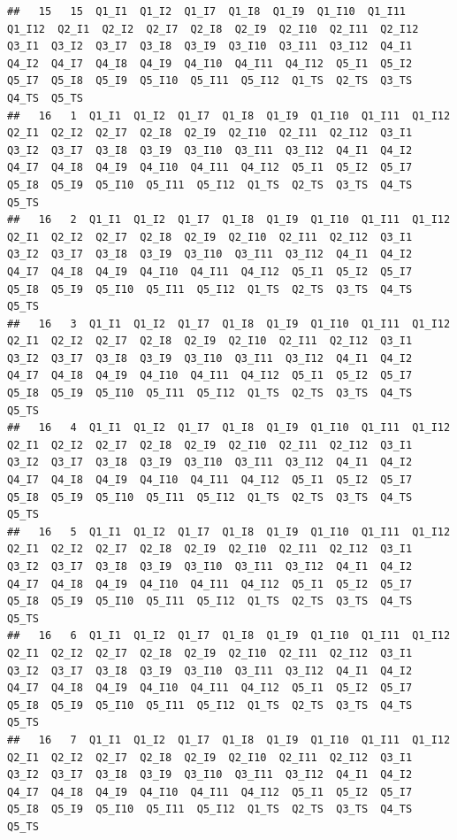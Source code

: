 \documentclass[
]{book}
\begin{document}
\begin{verbatim}
##   15   15  Q1_I1  Q1_I2  Q1_I7  Q1_I8  Q1_I9  Q1_I10  Q1_I11  Q1_I12  Q2_I1  Q2_I2  Q2_I7  Q2_I8  Q2_I9  Q2_I10  Q2_I11  Q2_I12  Q3_I1  Q3_I2  Q3_I7  Q3_I8  Q3_I9  Q3_I10  Q3_I11  Q3_I12  Q4_I1  Q4_I2  Q4_I7  Q4_I8  Q4_I9  Q4_I10  Q4_I11  Q4_I12  Q5_I1  Q5_I2  Q5_I7  Q5_I8  Q5_I9  Q5_I10  Q5_I11  Q5_I12  Q1_TS  Q2_TS  Q3_TS  Q4_TS  Q5_TS
##   16   1  Q1_I1  Q1_I2  Q1_I7  Q1_I8  Q1_I9  Q1_I10  Q1_I11  Q1_I12  Q2_I1  Q2_I2  Q2_I7  Q2_I8  Q2_I9  Q2_I10  Q2_I11  Q2_I12  Q3_I1  Q3_I2  Q3_I7  Q3_I8  Q3_I9  Q3_I10  Q3_I11  Q3_I12  Q4_I1  Q4_I2  Q4_I7  Q4_I8  Q4_I9  Q4_I10  Q4_I11  Q4_I12  Q5_I1  Q5_I2  Q5_I7  Q5_I8  Q5_I9  Q5_I10  Q5_I11  Q5_I12  Q1_TS  Q2_TS  Q3_TS  Q4_TS  Q5_TS
##   16   2  Q1_I1  Q1_I2  Q1_I7  Q1_I8  Q1_I9  Q1_I10  Q1_I11  Q1_I12  Q2_I1  Q2_I2  Q2_I7  Q2_I8  Q2_I9  Q2_I10  Q2_I11  Q2_I12  Q3_I1  Q3_I2  Q3_I7  Q3_I8  Q3_I9  Q3_I10  Q3_I11  Q3_I12  Q4_I1  Q4_I2  Q4_I7  Q4_I8  Q4_I9  Q4_I10  Q4_I11  Q4_I12  Q5_I1  Q5_I2  Q5_I7  Q5_I8  Q5_I9  Q5_I10  Q5_I11  Q5_I12  Q1_TS  Q2_TS  Q3_TS  Q4_TS  Q5_TS
##   16   3  Q1_I1  Q1_I2  Q1_I7  Q1_I8  Q1_I9  Q1_I10  Q1_I11  Q1_I12  Q2_I1  Q2_I2  Q2_I7  Q2_I8  Q2_I9  Q2_I10  Q2_I11  Q2_I12  Q3_I1  Q3_I2  Q3_I7  Q3_I8  Q3_I9  Q3_I10  Q3_I11  Q3_I12  Q4_I1  Q4_I2  Q4_I7  Q4_I8  Q4_I9  Q4_I10  Q4_I11  Q4_I12  Q5_I1  Q5_I2  Q5_I7  Q5_I8  Q5_I9  Q5_I10  Q5_I11  Q5_I12  Q1_TS  Q2_TS  Q3_TS  Q4_TS  Q5_TS
##   16   4  Q1_I1  Q1_I2  Q1_I7  Q1_I8  Q1_I9  Q1_I10  Q1_I11  Q1_I12  Q2_I1  Q2_I2  Q2_I7  Q2_I8  Q2_I9  Q2_I10  Q2_I11  Q2_I12  Q3_I1  Q3_I2  Q3_I7  Q3_I8  Q3_I9  Q3_I10  Q3_I11  Q3_I12  Q4_I1  Q4_I2  Q4_I7  Q4_I8  Q4_I9  Q4_I10  Q4_I11  Q4_I12  Q5_I1  Q5_I2  Q5_I7  Q5_I8  Q5_I9  Q5_I10  Q5_I11  Q5_I12  Q1_TS  Q2_TS  Q3_TS  Q4_TS  Q5_TS
##   16   5  Q1_I1  Q1_I2  Q1_I7  Q1_I8  Q1_I9  Q1_I10  Q1_I11  Q1_I12  Q2_I1  Q2_I2  Q2_I7  Q2_I8  Q2_I9  Q2_I10  Q2_I11  Q2_I12  Q3_I1  Q3_I2  Q3_I7  Q3_I8  Q3_I9  Q3_I10  Q3_I11  Q3_I12  Q4_I1  Q4_I2  Q4_I7  Q4_I8  Q4_I9  Q4_I10  Q4_I11  Q4_I12  Q5_I1  Q5_I2  Q5_I7  Q5_I8  Q5_I9  Q5_I10  Q5_I11  Q5_I12  Q1_TS  Q2_TS  Q3_TS  Q4_TS  Q5_TS
##   16   6  Q1_I1  Q1_I2  Q1_I7  Q1_I8  Q1_I9  Q1_I10  Q1_I11  Q1_I12  Q2_I1  Q2_I2  Q2_I7  Q2_I8  Q2_I9  Q2_I10  Q2_I11  Q2_I12  Q3_I1  Q3_I2  Q3_I7  Q3_I8  Q3_I9  Q3_I10  Q3_I11  Q3_I12  Q4_I1  Q4_I2  Q4_I7  Q4_I8  Q4_I9  Q4_I10  Q4_I11  Q4_I12  Q5_I1  Q5_I2  Q5_I7  Q5_I8  Q5_I9  Q5_I10  Q5_I11  Q5_I12  Q1_TS  Q2_TS  Q3_TS  Q4_TS  Q5_TS
##   16   7  Q1_I1  Q1_I2  Q1_I7  Q1_I8  Q1_I9  Q1_I10  Q1_I11  Q1_I12  Q2_I1  Q2_I2  Q2_I7  Q2_I8  Q2_I9  Q2_I10  Q2_I11  Q2_I12  Q3_I1  Q3_I2  Q3_I7  Q3_I8  Q3_I9  Q3_I10  Q3_I11  Q3_I12  Q4_I1  Q4_I2  Q4_I7  Q4_I8  Q4_I9  Q4_I10  Q4_I11  Q4_I12  Q5_I1  Q5_I2  Q5_I7  Q5_I8  Q5_I9  Q5_I10  Q5_I11  Q5_I12  Q1_TS  Q2_TS  Q3_TS  Q4_TS  Q5_TS

\end{verbatim}
\end{document}
